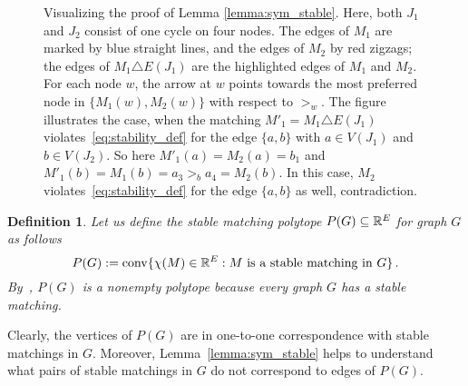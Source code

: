 \documentclass[3p,times]{elsarticle}
\newtheorem{definition}[fact]{Definition}
\DeclareMathOperator{\convOp}{conv}
\newcommand{\conv}{\convOp}
\begin{document}
\begin{figure}[H]
\caption{Visualizing the proof of Lemma \ref{lemma:sym_stable}.  Here, both $J_1$ and $J_2$ consist of one cycle on four nodes. The edges of $M_1$ are marked by blue straight lines, and the edges of $M_2$ by red zigzags; the edges of $M_1\triangle  E(J_1)$ are the highlighted edges of $M_1$ and $M_2$. For each node $w$, the arrow at $w$ points towards the most preferred node in $\{M_1(w), M_2(w)\}$ with respect to $>_w$. 
The figure illustrates the case, when the matching $M'_1=M_1\triangle E(J_1)$ violates~\eqref{eq:stability_def} for the edge $\{a,b\}$ with $a\in V(J_1)$
  and $b\in V(J_2)$. So here $M'_1(a)=M_2(a)=b_1$ and $M'_1(b)=M_1(b)=a_3>_{b} a_4=M_2(b)$. In this case, $M_2$ violates~\eqref{eq:stability_def} for the edge $\{a,b\}$ as well, contradiction.}
\label{fig:sym_stable}
\end{figure}


\begin{definition}Let us define the \emph{stable matching polytope} $P(G)\subseteq\mathbb{R}^E$ for graph $G$ as follows
$$
	P(G):=\conv\{\chi(M)\in\R^E: M \text{ is a stable matching in } G\}\,.
$$
By~\cite{gale1962college}, $P(G)$ is a nonempty polytope because every
graph $G$ has a stable matching.
\end{definition}
Clearly, the vertices of $P(G)$ are in one-to-one correspondence with
stable matchings in $G$. Moreover, Lemma~\ref{lemma:sym_stable} helps
to understand what pairs of stable matchings in $G$ do not correspond
to edges of $P(G)$.
\end{document}
